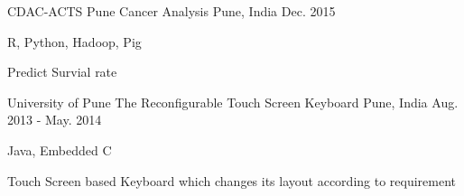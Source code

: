 

\begin{cventries}

  \cventry
    {CDAC-ACTS Pune} %
    {Cancer Analysis} %
    {Pune, India} %
    {Dec. 2015} %
    {
      \begin{cvitems} %
        \item {R, Python, Hadoop, Pig}
        \item {Predict Survial rate}
      \end{cvitems}
    }
  
  \cventry
    {University of Pune} %
    {The Reconfigurable Touch Screen Keyboard} %
    {Pune, India} %
    {Aug. 2013 - May. 2014} %
    {
      \begin{cvitems} %
        \item {Java, Embedded C}
        \item {Touch Screen based Keyboard which changes its layout according to requirement}
      \end{cvitems}
    }


\end{cventries}
